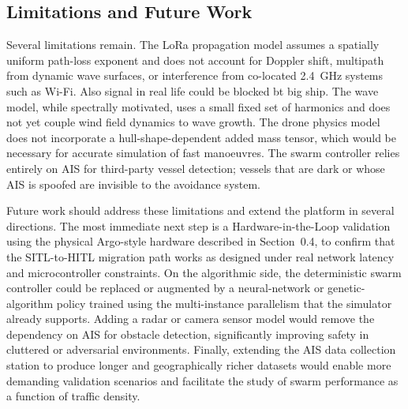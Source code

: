 \subsection*{Limitations and Future Work}

Several limitations remain. The LoRa propagation model assumes a spatially
uniform path-loss exponent and does not account for Doppler shift, multipath
from dynamic wave surfaces, or interference from co-located 2.4~GHz systems
such as Wi-Fi. Also signal in real life could be blocked bt big ship.
The wave model, while spectrally motivated, uses a small fixed
set of harmonics and does not yet couple wind field dynamics to wave growth.
The drone physics model does not incorporate a hull-shape-dependent added
mass tensor, which would be necessary for accurate simulation of fast
manoeuvres. The swarm controller relies entirely on AIS for third-party vessel
detection; vessels that are dark or whose AIS is spoofed are invisible to the
avoidance system.

Future work should address these limitations and extend the platform in
several directions. The most immediate next step is a Hardware-in-the-Loop
validation using the physical Argo-style hardware described in Section~0.4, to
confirm that the SITL-to-HITL migration path works as designed under real
network latency and microcontroller constraints. On the algorithmic side, the
deterministic swarm controller could be replaced or augmented by a
neural-network or genetic-algorithm policy trained using the multi-instance
parallelism that the simulator already supports. Adding a radar or camera
sensor model would remove the dependency on AIS for obstacle detection,
significantly improving safety in cluttered or adversarial environments.
Finally, extending the AIS data collection station to produce longer and
geographically richer datasets would enable more demanding validation
scenarios and facilitate the study of swarm performance as a function of
traffic density.